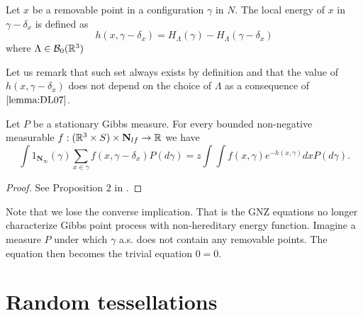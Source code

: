 \begin{definition}\label{def:localenergy}
	Let $x$ be a removable point in a configuration $\gamma$ in $N$. The local energy of $x$ in $\gamma - \delta_x$ is defined as
	$$h(x,\gamma - \delta_x) = H_\Lambda (\gamma) - H_\Lambda(\gamma - \delta_x)$$
	where $\Lambda \in \mathcal B_0({\mathbb R^3})$
\end{definition}
Let us remark that such set always exists by definition and that the value of $h(x,\gamma-\delta_x)$ does not depend on the choice of $\Lambda$ as a consequence of $\ref{lemma:DL07}$.


\begin{proposition}
	Let $P$ be a stationary Gibbs measure. For every bounded non-negative measurable $f:({\mathbb R^3}\times S) \times \mathbf N_{lf}\to\mathbb R$ we have
	$$\int 1_{\mathbf N_\infty}(\gamma) \sum_{x \in \gamma} f(x,\gamma -\delta_x) P(d\gamma) = z \int \int f(x,\gamma)e^{-h(x,\gamma)} dx P(d\gamma).$$
\end{proposition}
\begin{proof}
	See Proposition $2$ in \cite{DereudreLavancier2007}.
\end{proof}

Note that we lose the converse implication. That is the GNZ equations no longer characterize Gibbs point process with non-hereditary energy function. Imagine a measure $P$ under which $\gamma$ a.s. does not contain any removable points. The equation then becomes the trivial equation $0=0$.





\section{Random tessellations}
